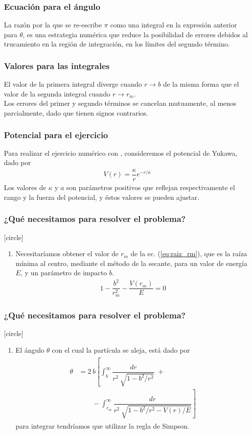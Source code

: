 \begin{frame}
\frametitle{Ecuación para el ángulo}
La razón por la que se re-escribe $\pi$ como una integral en la expresión anterior para $\theta$, es una estrategia numérica que reduce la posibilidad de errores debidos al trucamiento en la región de integración, en los límites del segundo término.
\end{frame}
\begin{frame}
\frametitle{Valores para las integrales}
El valor de la primera integral diverge cuando $r \to b$ de la misma forma que el valor de la segunda integral cuando $r \to r_{m}$.
\\
\bigskip
\pause
Los errores del primer y segundo términos se cancelan mutuamente, al menos parcialmente, dado que tienen signos contrarios.
\end{frame}
\begin{frame}
\frametitle{Potencial para el ejercicio}
Para realizar el ejercicio numérico con \python, consideremos el potencial de Yukawa, dado por
\begin{align*}
V(r) = \dfrac{\kappa}{r} e^{-r/a}
\end{align*}
Los valores de $\kappa$ y $a$ son parámetros positivos que reflejan respectivamente el rango y la fuerza del potencial, y éstos valores se pueden ajustar.
\end{frame}
\begin{frame}
\frametitle{¿Qué necesitamos para resolver el problema?}
[circle]
\begin{enumerate}[<+->]
\item Necesitaríamos obtener el valor de $r_{m}$ de la ec. (\ref{eq:raiz_rm}), que es la raíza mínima al centro,  mediante el método de la secante, para un valor de energía $E$, y un parámetro de impacto $b$.
\begin{align*}
1  - \dfrac{b^{2}}{r_{m}^{2}} - \dfrac{V(r_{m})}{E} = 0
\end{align*}
\seti
\end{enumerate}
\end{frame}
\begin{frame}
\frametitle{¿Qué necesitamos para resolver el problema?}
[circle]
\begin{enumerate}
\conti
\item El ángulo $\theta$ con el cual la partícula se aleja, está dado por
\begin{align*}
\begin{aligned}
\theta &= 2 \: b \left[ \int_{b}^{\infty} \dfrac{dr}{r^{2} \: \sqrt{1 - b^{2}/r^{2}}} \; + \right. \\
& \qquad - \left. \int_{r_{m}}^{\infty} \dfrac{dr}{r^{2} \: \sqrt{1 - b^{2}/r^{2} - V(r)/E}} \right]
\end{aligned}
\end{align*}
para integrar tendríamos que utilizar la regla de Simpson.
\seti
\end{enumerate}
\end{frame}
